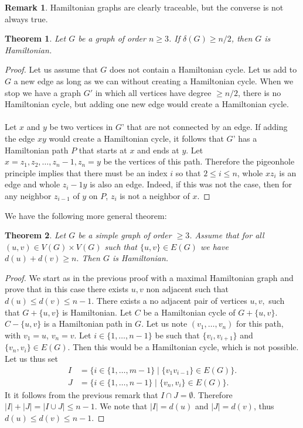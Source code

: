 \documentclass[12pt,a4paper]{article}
\newtheorem{thm}{Theorem}[section]
\theoremstyle{definition}
\newtheorem{rem}{Remark}[section]
\begin{document}
\begin{rem} Hamiltonian graphs are clearly traceable, but the converse is not always true. 
\end{rem}
\begin{thm} Let $G$ be a graph of order $n \geq 3$. If $\delta(G) \geq n/2$, then $G$ is Hamiltonian. 
\end{thm}
\begin{proof}
Let us assume that $G$ does not contain a Hamiltonian cycle. Let us add to $G$ a new edge as long as we can without creating a Hamiltonian cycle. When we stop we have a graph $G'$ in which all vertices have degree $\geq n/2$, there is no Hamiltonian cycle, but adding one new edge would create a Hamiltonian cycle. 
\\\\
Let $x$ and $y$ be two vertices in $G’$ that are not connected by an edge. If adding the edge $xy$ would create a Hamiltonian cycle, it follows that $G’$ has a Hamiltonian path $P$ that starts at $x$ and ends at $y$. Let $x=z_1,z_2, \dots , z_n-1, z_n=y$ be the vertices of this path. Therefore the pigeonhole principle implies that there must be an index $i$ so that $2\leq i \leq n$, whole $xz_i$ is an edge and whole $z_i-1y$ is also an edge. Indeed, if this was not the case, then for any neighbor $z_{i-1}$ of $y$ on $P$, $z_i$ is not a neighbor of $x$.
\end{proof}
We have the following more general theorem:
\begin{thm} Let $G$ be a simple graph of order $\geq 3$. Assume that for all $(u,v) \in V(G) \times V(G)$ such that $\{u, v\} \in E(G)$ we have $d(u) + d(v) \geq n.$ Then $G$ is Hamiltonian. 
\end{thm}
\begin{proof}
We start as in the previous proof with a maximal Hamiltonian graph and prove that in this case there exists $u,v$ non adjacent such that $d(u) \leq d(v) \leq n-1.$ There exists a no adjacent pair of vertices $u,v,$ such that $G+\{u,v\}$ is Hamiltonian. Let $C$ be a Hamiltonian cycle of $G+\{u,v\}$. $C-\{u,v\}$ is a Hamiltonian path in $G$. Let us note $(v_1, \dots ,  v_n)$ for this path, with $v_1=u$, $v_n=v$. Let $i \in \{1, \dots ,  n-1\}$ be such that $\{v_i , v_{i+1}\}$ and $\{v_n, v_i\} \in E(G)$. Then this would be a Hamiltonian cycle, which is not possible. 
\newpage
Let us thus set 
\begin{align*}
I&= \{i \in \{1, \dots ,  m-1\} \mid \{v_1v_{i-1} \} \in E(G) \}. \\
J&= \{i \in \{1, \dots , n-1\} \mid \{v_n , v_i\} \in E(G) \}. 
\end{align*} 
It it follows from the previous remark that $I \cap J = \emptyset$. Therefore $|I|+|J| = | I \cup J| \leq n-1$. We note that $|I|=d(u)$ and $|J|=d(v)$, thus $d(u) \leq d(v) \leq n-1$. 
\end{proof}
\end{document}
